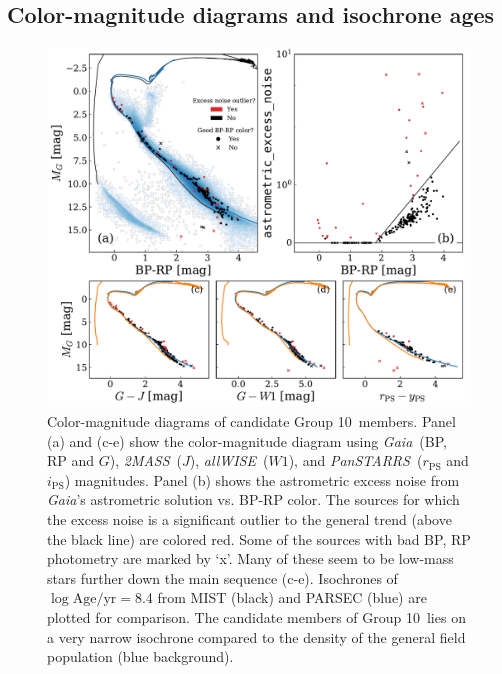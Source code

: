 \documentclass[modern,letterpaper]{aastex61}
\newcommand{\project}[1]{\textsl{#1}}
\newcommand{\acronym}[1]{{\small{#1}}}
\newcommand{\gaia}{\project{Gaia}}
\newcommand{\tmass}{\project{\acronym{2MASS}}}
\newcommand{\allwise}{\project{\acronym{allWISE}}}
\newcommand{\panstarrs}{\project{\acronym{PanSTARRS}}}
\newcommand{\groupTen}{Group 10}
\begin{document}
%
%
%
%


\subsection{Color-magnitude diagrams and isochrone ages}

\begin{figure}
  \includegraphics[width=0.95\linewidth]{bp_rp_G.pdf}
  \caption{
    Color-magnitude diagrams of candidate \groupTen\ members.
    Panel (a) and (c-e) show the color-magnitude diagram using \gaia\ (BP, RP and $G$),
    \tmass\ ($J$), \allwise\ ($W1$), and \panstarrs\ ($r_\mathrm{PS}$ and $i_\mathrm{PS}$)
    magnitudes. Panel (b) shows the astrometric excess noise from \gaia's astrometric
    solution vs. BP-RP color. The sources for which the excess noise is a significant
    outlier to the general trend (above the black line) are colored red.
    Some of the sources with bad BP, RP photometry are marked by `x'.
    Many of these seem to be low-mass stars further down the main sequence (c-e).
    Isochrones of $\log\mathrm{Age/yr}=8.4$ from MIST (black) and PARSEC (blue)
    are plotted for comparison.
    The candidate members of \groupTen\ lies on a very narrow isochrone
    compared to the density of the general field population (blue background).
  }
  \label{fig:cmd}
\end{figure}
\end{document}
